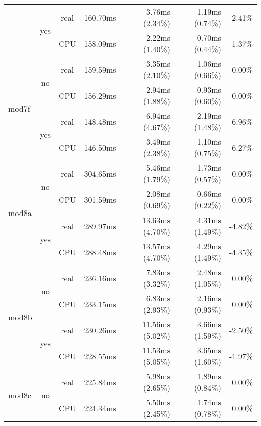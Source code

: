 \documentclass[en]{pracamgr}
\begin{document}
\begin{appendices}
\begin{small}
\begin{longtable}{|l|c|c|r|r|r|r|}
                          \cline{2-7}
                          & \multirow{2}{*}{yes} & real & 160.70ms & 3.76ms (2.34\%) & 1.19ms (0.74\%) & 2.41\% \\*
                          &                      & CPU  & 158.09ms & 2.22ms (1.40\%) & 0.70ms (0.44\%) & 1.37\% \\
\hline
\multirow{4}{*}{mod7f}    & \multirow{2}{*}{no}  & real & 159.59ms & 3.35ms (2.10\%) & 1.06ms (0.66\%) & 0.00\% \\*
                          &                      & CPU  & 156.29ms & 2.94ms (1.88\%) & 0.93ms (0.60\%) & 0.00\% \\*
                          \cline{2-7}
                          & \multirow{2}{*}{yes} & real & 148.48ms & 6.94ms (4.67\%) & 2.19ms (1.48\%) & -6.96\% \\*
                          &                      & CPU  & 146.50ms & 3.49ms (2.38\%) & 1.10ms (0.75\%) & -6.27\% \\
\hline
\multirow{4}{*}{mod8a}    & \multirow{2}{*}{no}  & real & 304.65ms & 5.46ms (1.79\%) & 1.73ms (0.57\%) & 0.00\% \\*
                          &                      & CPU  & 301.59ms & 2.08ms (0.69\%) & 0.66ms (0.22\%) & 0.00\% \\*
                          \cline{2-7}
                          & \multirow{2}{*}{yes} & real & 289.97ms & 13.63ms (4.70\%) & 4.31ms (1.49\%) & -4.82\% \\*
                          &                      & CPU  & 288.48ms & 13.57ms (4.70\%) & 4.29ms (1.49\%) & -4.35\% \\
\hline
\multirow{4}{*}{mod8b}    & \multirow{2}{*}{no}  & real & 236.16ms & 7.83ms (3.32\%) & 2.48ms (1.05\%) & 0.00\% \\*
                          &                      & CPU  & 233.15ms & 6.83ms (2.93\%) & 2.16ms (0.93\%) & 0.00\% \\*
                          \cline{2-7}
                          & \multirow{2}{*}{yes} & real & 230.26ms & 11.56ms (5.02\%) & 3.66ms (1.59\%) & -2.50\% \\*
                          &                      & CPU  & 228.55ms & 11.53ms (5.05\%) & 3.65ms (1.60\%) & -1.97\% \\
\hline
\multirow{4}{*}{mod8c}    & \multirow{2}{*}{no}  & real & 225.84ms & 5.98ms (2.65\%) & 1.89ms (0.84\%) & 0.00\% \\*
                          &                      & CPU  & 224.34ms & 5.50ms (2.45\%) & 1.74ms (0.78\%) & 0.00\% \\*

\end{longtable}
\end{small}
\end{appendices}
\end{document}
